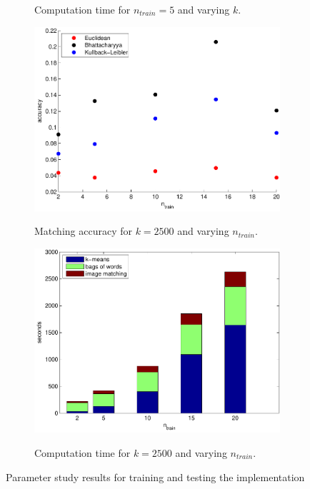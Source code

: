 \documentclass[11pt,a4paper]{article}
\begin{document}
\begin{figure}[H]
\begin{subfigure}[t]{0.48\textwidth}
        \label{fig:results_k_time}
        \caption{Computation time for $n_{train} = 5$ and varying $k$.}
    \end{subfigure}
    \begin{subfigure}[t]{0.48\textwidth}
        \includegraphics[width=\textwidth]{images/results_n_train.pdf}
        \label{fig:results_n_train}
        \caption{Matching accuracy for $k = 2500$ and varying $n_{train}$.}
    \end{subfigure}
    \begin{subfigure}[t]{0.48\textwidth}
        \includegraphics[width=\textwidth]{images/results_n_train_time.pdf}
        \label{fig:results_n_train_time}
        \caption{Computation time for $k = 2500$ and varying $n_{train}$.}
    \end{subfigure}
    \caption{Parameter study results for training and testing the
    implementation}
    \label{fig:parameter_results}
\end{figure}
\end{document}
